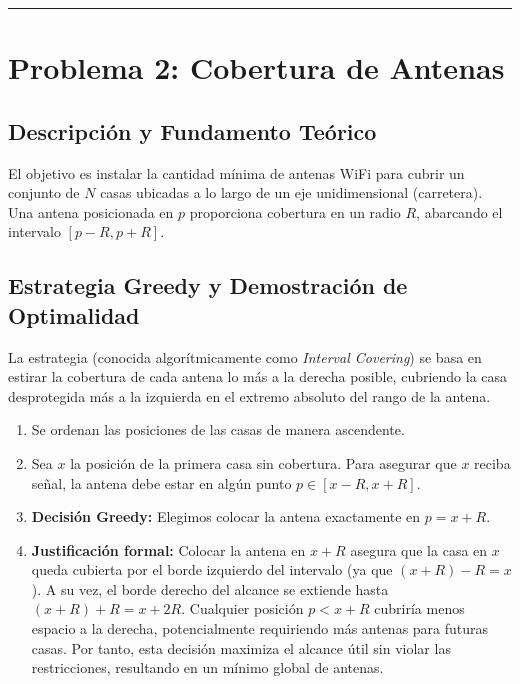\documentclass[11pt, a4paper]{article}
\begin{document}
\vspace{0.5cm}
\hrule
\vspace{0.5cm}

\section{Problema 2: Cobertura de Antenas}

\subsection{Descripción y Fundamento Teórico}
El objetivo es instalar la cantidad mínima de antenas WiFi para cubrir un conjunto de $N$ casas ubicadas a lo largo de un eje unidimensional (carretera). Una antena posicionada en $p$ proporciona cobertura en un radio $R$, abarcando el intervalo $[p - R, p + R]$.

\subsection{Estrategia Greedy y Demostración de Optimalidad}
La estrategia (conocida algorítmicamente como \textit{Interval Covering}) se basa en estirar la cobertura de cada antena lo más a la derecha posible, cubriendo la casa desprotegida más a la izquierda en el extremo absoluto del rango de la antena.
\begin{enumerate}
    \item Se ordenan las posiciones de las casas de manera ascendente.
    \item Sea $x$ la posición de la primera casa sin cobertura. Para asegurar que $x$ reciba señal, la antena debe estar en algún punto $p \in [x - R, x + R]$.
    \item \textbf{Decisión Greedy:} Elegimos colocar la antena exactamente en $p = x + R$. 
    \item \textbf{Justificación formal:} Colocar la antena en $x + R$ asegura que la casa en $x$ queda cubierta por el borde izquierdo del intervalo (ya que $(x+R)-R = x$). A su vez, el borde derecho del alcance se extiende hasta $(x+R)+R = x + 2R$. Cualquier posición $p < x + R$ cubriría menos espacio a la derecha, potencialmente requiriendo más antenas para futuras casas. Por tanto, esta decisión maximiza el alcance útil sin violar las restricciones, resultando en un mínimo global de antenas.
\end{enumerate}
\end{document}

